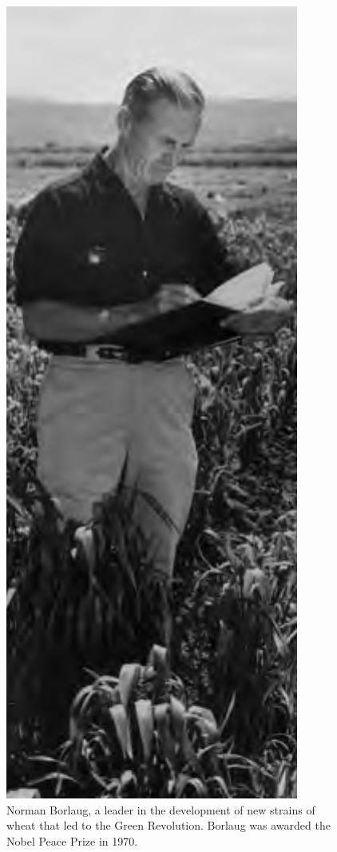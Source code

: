 \documentclass[11pt,ignorenonframetext,aspectratio=169]{beamer}
\begin{document}
\begin{frame}{}
\protect\hypertarget{section}{}
\begin{columns}[T,onlytextwidth]
  

\begin{figure}
\includegraphics[width=0.38\linewidth]{../images/green_revolution_borlaug} \caption{Norman Borlaug, a leader in the development of new strains of wheat that led to the Green Revolution. Borlaug was awarded the Nobel Peace Prize in 1970.}\label{fig:green-revolution-borlaug}
\end{figure}



\end{columns}
\end{frame}
\end{document}
